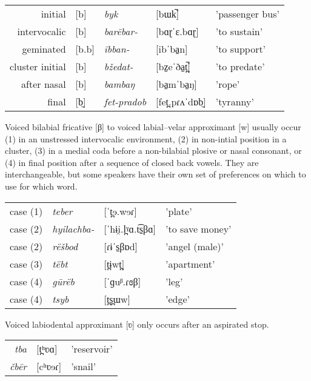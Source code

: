 \begin{tabular}{rllll}
initial         & {[}b{]}   & \textit{byk}        & {[}bɯk̚{]}          & 'passenger bus' \\
intervocalic    & {[}b{]}   & \textit{barēbar-}   & {[}bɑɽˈɛ.bɑɽ{]}     & 'to sustain'    \\
geminated       & {[}b.b{]} & \textit{ībban-}     & {[}ibˈba̠n{]}       & 'to support'    \\
cluster initial & {[}b{]}   & \textit{bžedat-}    & {[}bz̠eˈða̠t̪̚{]}   & 'to predate'    \\
after nasal     & {[}b{]}   & \textit{bambaŋ}     & {[}ba̠mˈba̠ŋ{]}     & 'rope'          \\
final           & {[}b̫{]}   & \textit{fet-pradob} & {[}fet̪.pɾʌˈdɒb̫{]} & 'tyranny'      
\end{tabular}

Voiced bilabial fricative [β] to voiced labial–velar approximant [w] usually occur (1) in an unstressed intervocalic environment, (2) in non-intial position in a cluster, (3) in a medial coda before a non-bilabial plosive or nasal consonant, or (4) in final position after a sequence of closed back vowels. They are interchangeable, but some speakers have their own set of preferences on which to use for which word.

\begin{tabular}{rlll}
case (1)                     & \textit{teber}      & {[}ˈt̪ɘ.wɘɾ{]}          & 'plate'             \\
case (2)                     & \textit{hyilachba-} & {[}ˈhɨi̯.l̪ˠɑ.t͡s̠βɑ{]} & 'to save money'     \\
case (2)                     & \textit{rëšbod}     & {[}ɾɨˈs̠βɒd{]}          & 'angel (male)' \\
case (3)                     & \textit{tëbt}       & {[}t̪ɨwt̪{]}            & 'apartment'         \\
case (4) & \textit{gūrëb}               & {[}ˈɡuᵝ.ɾɞβ{]}          & 'leg'               \\
case (4) & \textit{tsyb}                & {[}t̪s̪ɯw{]}            & 'edge'             
\end{tabular}

Voiced labiodental approximant [ʋ] only occurs after an aspirated stop.
\begin{tabular}{rll}
\textit{tba}      & {[}t̪ʰʋɑ{]}          & 'reservoir'             \\
\textit{čbēr}      & {[}cʰʋɘɾ{]}          & 'snail'             \\
\end{tabular}

